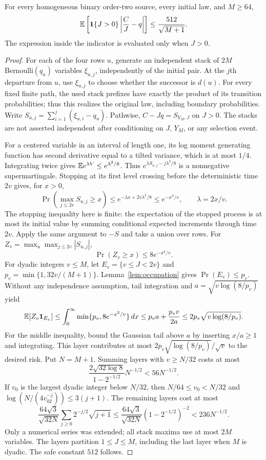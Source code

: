\begin{lemma}\label{lem:empirical}
For every homogeneous binary order-two source, every initial law, and
$M\ge64$,
\[
 \mathbb E\left[\mathbf1\{J>0\}\left|\frac CJ-q\right|\right]
 \le\frac{512}{\sqrt{M+1}}.
\]
The expression inside the indicator is evaluated only when $J>0$.
\end{lemma}
\begin{proof}
For each of the four rows $u$, generate an independent stack of $2M$
Bernoulli$(q_u)$ variables $\xi_{u,j}$, independently of the initial pair.
At the $j$th departure from $u$, use $\xi_{u,j}$ to choose whether the
successor is $d(u)$.  For every fixed finite path, the used stack prefixes
have exactly the product of its transition probabilities; thus this realizes
the original law, including boundary probabilities.  Write
$S_{u,j}=\sum_{i=1}^j(\xi_{u,i}-q_u)$.  Pathwise,
$C-Jq=S_{Y_M,J}$ on $J>0$.  The stacks are not asserted independent after
conditioning on $J$, $Y_M$, or any selection event.

For a centered variable in an interval of length one, its log moment
generating function has second derivative equal to a tilted variance,
which is at most $1/4$.  Integrating twice gives
$\mathbb E e^{\lambda V}\le e^{\lambda^2/8}$.  Thus
$e^{\lambda S_{u,j}-j\lambda^2/8}$ is a nonnegative supermartingale.
Stopping at its first level crossing before the deterministic time $2v$
gives, for $x>0$,
\[
 \Pr\left(\max_{j\le2v}S_{u,j}\ge x\right)
 \le e^{-\lambda x+2v\lambda^2/8}
 \le e^{-x^2/v},\qquad \lambda=2x/v.
\]
The stopping inequality here is finite: the expectation of the stopped
process is at most its initial value by summing conditional expected
increments through time $2v$.  Apply the same argument to $-S$ and take
a union over rows.  For $Z_v=\max_u\max_{j\le2v}|S_{u,j}|$,
\begin{equation}\label{eq:p-stack-tail}
 \Pr(Z_v\ge x)\le8e^{-x^2/v}.
\end{equation}
For dyadic integers $v\le M$, let $E_v=\{v\le J<2v\}$ and
$p_v=\min\{1,32v/(M+1)\}$.  Lemma~\ref{lem:occupation} gives
$\Pr(E_v)\le p_v$.  Without any independence assumption, tail integration
and $a=\sqrt{v\log(8/p_v)}$ yield
\[
 \mathbb E[Z_v\mathbf1_{E_v}]
 \le\int_0^\infty\min\{p_v,8e^{-x^2/v}\}\,dx
 \le p_va+\frac{p_vv}{2a}
 \le2p_v\sqrt{v\log(8/p_v)}.
\]
For the middle inequality, bound the Gaussian tail above $a$ by inserting
$x/a\ge1$ and integrating.  This layer contributes at most
$2p_v\sqrt{\log(8/p_v)}/\sqrt v$ to the desired risk.
Put $N=M+1$.  Summing layers with $v\ge N/32$ costs at most
\[
 \frac{2\sqrt{32\log8}}{1-2^{-1/2}}N^{-1/2}<56N^{-1/2}.
\]
If $v_0$ is the largest dyadic integer below $N/32$, then
$N/64\le v_0<N/32$ and
$\log(N/(4v_02^{-j}))\le3(j+1)$.  The remaining layers cost at most
\[
 \frac{64\sqrt3}{\sqrt{32N}}
 \sum_{j\ge0}2^{-j/2}\sqrt{j+1}
 \le\frac{64\sqrt3}{\sqrt{32N}}(1-2^{-1/2})^{-2}
 <236N^{-1/2}.
\]
Only a numerical series was extended; all stack maxima use at most $2M$
variables.  The layers partition $1\le J\le M$, including the last layer
when $M$ is dyadic.  The safe constant $512$ follows.
\end{proof}

